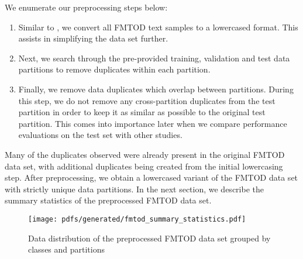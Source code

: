 We enumerate our preprocessing steps below:

\begin{enumerate}{}
  \item Similar to \citet{schwartz2018sopa}, we convert all FMTOD text samples to a lowercased format. This assists in simplifying the data set further.
  \item Next, we search through the pre-provided training, validation and test data partitions to remove duplicates within each partition.
  \item Finally, we remove data duplicates which overlap between partitions. During this step, we do not remove any cross-partition duplicates from the test partition in order to keep it as similar as possible to the original test partition. This comes into importance later when we compare performance evaluations on the test set with other studies.
\end{enumerate}

Many of the duplicates observed were already present in the original FMTOD data set, with additional duplicates being created from the initial lowercasing step. After preprocessing, we obtain a lowercased variant of the FMTOD data set with strictly unique data partitions. In the next section, we describe the summary statistics of the preprocessed FMTOD data set.

\begin{figure}[t]
  \centering
  \texttt{[image: pdfs/generated/fmtod\_summary\_statistics.pdf]}
  \caption{Data distribution of the preprocessed FMTOD data set grouped by classes and partitions}
  \label{fig:fmtod}
\end{figure}

